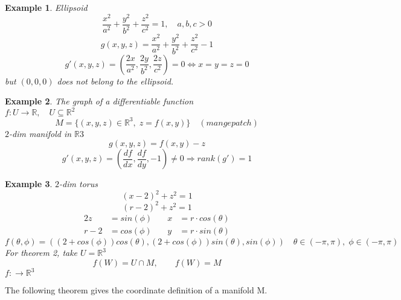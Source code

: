 \documentclass[12pt]{article}
\def\RR{\mathbb{R}}
\newtheorem{example}{Example}[section]
\begin{document}
\begin{example}
Ellipsoid
\[\frac{x^2}{a^2} +\frac{y^2}{b^2} +\frac{z^2}{c^2} =1, \quad a,b,c>0\]
\[g(x,y,z) = \frac{x^2}{a^2} +\frac{y^2}{b^2} +\frac{z^2}{c^2} -1 \]
\[g'(x,y,z) = (\frac{2x}{a^2}, \frac{2y}{b^2} , \frac{2z}{c^2}) = 0 \Leftrightarrow x=y=z=0 \]
but $(0,0,0)$ does not belong to the ellipsoid.
\end{example}

\begin{example}The graph of a differentiable function\\
$f:U \rightarrow \RR, \quad U \subseteq \RR^2$ 
\[M = \{(x,y,z) \in \RR^3, \; z=f(x,y)\}\quad (mange patch) \]
$2$-dim manifold in $\RR3$
\[g(x,y,z)=f(x,y) - z\]
\[g'(x,y,z) = (\frac{df}{dx},\frac{df}{dy},-1) \neq 0 \Rightarrow rank(g') = 1\]
\end{example}

\begin{example}$2$-dim torus\\
\[(x-2)^2 +z^2 =1\]
\[(r-2)^2 +z^2 =1\]
\begin{alignat*}{2}
z &= sin(\phi) & \quad x &=r\cdot cos(\theta)\\
r-2&= cos(\phi) & \quad y&=r\cdot sin(\theta)
\end{alignat*}
\[f(\theta, \phi) = ((2+cos(\phi))cos(\theta), (2+cos(\phi))sin(\theta), sin(\phi)) \quad \theta \in (-\pi , \pi), \; \phi \in (-\pi , \pi)\]
For theorem 2, take $U=\RR^3$
\[ f(W) = U \cap M,  \qquad f(W) = M \]
$f: \rightarrow \RR^3$

\end{example}




The following theorem gives the coordinate definition of a manifold M.
\end{document}
